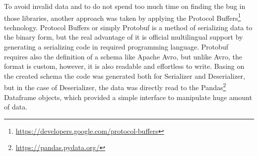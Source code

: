 To avoid invalid data and to do not spend too much time on finding the bug in those libraries, another approach was taken by applying the Protocol Buffers\footnote{\url{https://developers.google.com/protocol-buffers}} technology.
Protocol Buffers or simply Protobuf is a method of serializing data to the binary form, but the real advantage of it is official multilingual support by generating a serializing code in required programming language.
Protobuf requires also the definition of a schema like Apache Avro, but unlike Avro, the format is custom, however, it is also readable and effortless to write.
Basing on the created schema the code was generated both for Serializer and Deserializer, but in the case of Deserializer, the data was directly read to the Pandas\footnote{\url{https://pandas.pydata.org/}} Dataframe objects, which provided a simple interface to manipulate huge amount of data.
